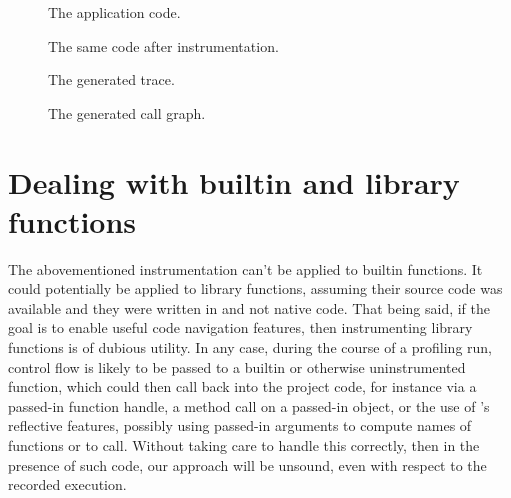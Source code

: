 
\begin{figure}[htbp]
\begin{minipage}{\linewidth}
  
\end{minipage}
\begin{minipage}{\linewidth}
  
\end{minipage}
\caption{The application code.}
\label{Fig:CallgraphBefore}
\end{figure}

\begin{figure}[htbp]
\begin{minipage}{\linewidth}
  
\end{minipage}
\begin{minipage}{\linewidth}
  
\end{minipage}
\caption{The same code after instrumentation.}
\label{Fig:CallgraphAfter}
\end{figure}

\begin{figure}[htbp]

\caption{The generated trace.}
\label{Fig:CallgraphTrace}
\end{figure}

\begin{figure}[htbp]

\caption{The generated call graph.}
\label{Fig:Callgraph}
\end{figure}

\section{Dealing with builtin and library functions} \label{sec:CallgraphBuiltins}

The abovementioned instrumentation can't be applied to \matlab builtin
functions. It could potentially be applied to library functions, assuming their
source code was available and they were written in \matlab and not native code.
That being said, if the goal is to enable useful code navigation features, then
instrumenting library functions is of dubious utility. In any case, during the
course of a profiling run, control flow is likely to be passed to a builtin or
otherwise uninstrumented function, which could then call back into the project
code, for instance via a passed-in function handle, a method call on a
passed-in object, or the use of \matlab's reflective features, possibly using
passed-in arguments to compute names of functions or to call. Without taking
care to handle this correctly, then in the presence of such code, our approach
will be unsound, even with respect to the recorded execution.

